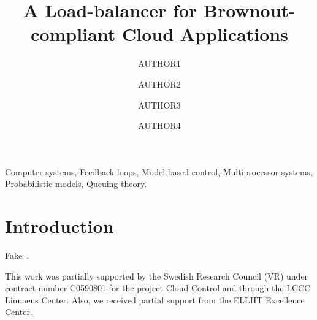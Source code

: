 \documentclass{ifacconf}
\begin{document}
\begin{frontmatter}
\title{A Load-balancer for Brownout-compliant Cloud Applications}

\author[Affiliation1]{AUTHOR1} 
\author[Affiliation1]{AUTHOR2}
\author[Affiliation2]{AUTHOR3}
\author[Affiliation1]{AUTHOR4}
\address[Affiliation1]{Department of Automatic Control, Lund University}
\address[Affiliation2]{Department of Computer Science, Ume{\aa} University}

\begin{abstract} %

\end{abstract}

\begin{keyword}
  Computer systems, Feedback loops, Model-based control,
  Multiprocessor systems, Probabilistic models, Queuing theory.
\end{keyword}

\end{frontmatter}

\section{Introduction}
\label{sec:introduction}


Fake~\cite{Fielding02}.


\begin{ack}
  This work was partially supported by the Swedish Research Council
  (VR) under contract number C0590801 for the project Cloud Control
  and through the LCCC Linnaeus Center. Also, we received partial
  support from the ELLIIT Excellence Center.
\end{ack}


\end{document}
